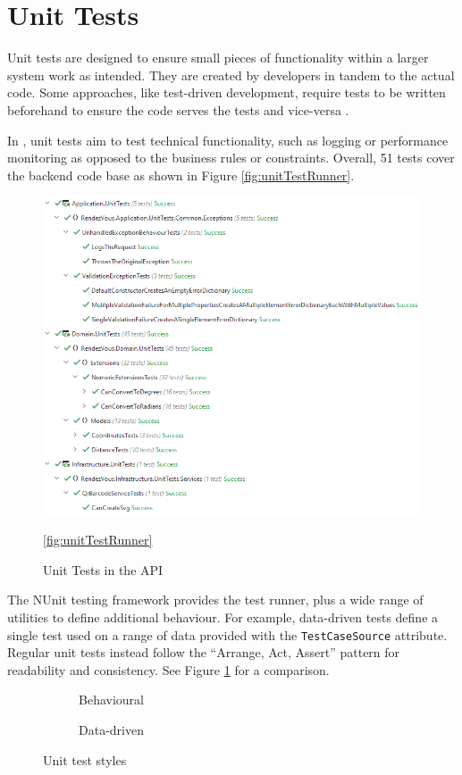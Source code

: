 \section{Unit Tests}

Unit tests are designed to ensure small pieces of
functionality within a larger system work as intended.
They are created by developers in tandem to the actual
code.
Some approaches, like test-driven development, require
tests to be written beforehand to ensure the code serves
the tests and vice-versa \parencite{softwareTesting}.

In \projectname{}, unit tests aim to test technical
functionality, such as logging or performance monitoring as
opposed to the business rules or constraints. Overall, 51
tests cover the backend code base as shown in 
Figure \ref{fig:unitTestRunner}.

\begin{figure}[h]
  \centering
  \includegraphics[width=0.9\linewidth]{07 testing/assets/unit/unit test runner.png}
  \caption{Unit Tests in the API}
  \ref{fig:unitTestRunner}
\end{figure}

The NUnit testing framework provides the test runner, plus
a wide range of utilities to define additional behaviour.
For example, data-driven tests define a single test used on
a range of data provided with the
\lstinline{TestCaseSource} attribute.
Regular unit tests instead follow the \enquote{Arrange,
  Act, Assert} pattern for readability and consistency.
See Figure \ref{fig:unitTestStyles} for a comparison.

\begin{figure}[h]
  \centering
  \small

  \begin{subfigure}{\linewidth}
    
    \caption{Behavioural}
  \end{subfigure}
  \begin{subfigure}{\linewidth}
    
    \caption{Data-driven}
  \end{subfigure}

  \caption{Unit test styles}
  \label{fig:unitTestStyles}
\end{figure}
